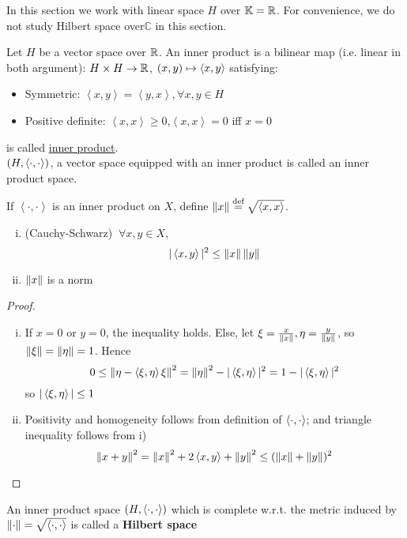 \documentclass{article}
\begin{document}
In this section we work with linear space $H$ over $\mathbb{K} = \mathbb{R}$. For convenience, we do not study Hilbert space over$\mathbb{ C}$ in this section.


\begin{definition}
	Let $H$ be a vector space over $\mathbb{R}$. An {\ibf inner product} is a bilinear map (i.e. linear in both argument):
	$H\times H\to\mathbb{R}$, $(x,y)\mapsto \left<{x},{y}\right>$ satisfying:
	\begin{itemize}
		\item Symmetric: $\left<x,y\right>={{\left<y,x\right>}},\forall x,y\in H$
		\item Positive definite: $\left<x,x\right>\geq0$,$\left<x,x\right>=0$ iff $x=0$
	\end{itemize}
	is called \underline{inner product}.\\
	$(H,\left<{\cdot},{\cdot}\right>)$, a vector space equipped with an inner product is called an inner product space.
\end{definition}



\begin{theorem}
	If $\left<\cdot,\cdot\right>$ is an inner product on $X$, define $\left\|{x}\right\|\overset{\textrm{def}}{=}\sqrt{\left<{x},{x}\right>}$.  
	\begin{enumerate}[i)]
	    \item (Cauchy-Schwarz) $\ \forall x,y\in X$,
	$$|\left<{x},{y}\right>|^2\leq \left\|{x}\right\| \left\|{y}\right\|$$
	\item $\left\|{x}\right\|$ is a norm
\end{enumerate}  
\end{theorem}

\begin{proof}
\begin{enumerate}[i)]
    \item If $x=0$ or $y=0$, the inequality holds. Else, let $\xi = \frac{x}{\left\|{x}\right\|}, \eta = \frac{y}{\left\|{y}\right\|}$, so $\left\|{\xi}\right\|=\left\|{\eta}\right\|=1$. Hence 
    $$0 \leq \left\|{\eta-\left<{\xi},{\eta}\right>\xi}\right\|^2=\left\|{\eta}\right\|^2 - |\left<{\xi},{\eta}\right>|^2=1-|\left<{\xi},{\eta}\right>|^2$$  
    so $|\left<{\xi},{\eta}\right>| \leq 1$
    \item Positivity and homogeneity follows from definition of $\left<{\cdot},{\cdot}\right>$; and triangle inequality follows from i)  
    $$
    \left\|{x+y}\right\|^2=\left\|{x}\right\|^2 + 2 \left<{x},{y}\right> + \left\|{y}\right\|^2 \leq (\left\|{x}\right\|+\left\|{y}\right\|)^2
    $$
\end{enumerate}
\end{proof}

\begin{definition}
    An inner product space $(H, \left<{\cdot},{\cdot}\right>)$ which is complete w.r.t. the metric induced by $\left\|{\cdot}\right\|=\sqrt{\left<{\cdot},{\cdot}\right>}$ is called a \textbf{Hilbert space}
\end{definition}
\end{document}
